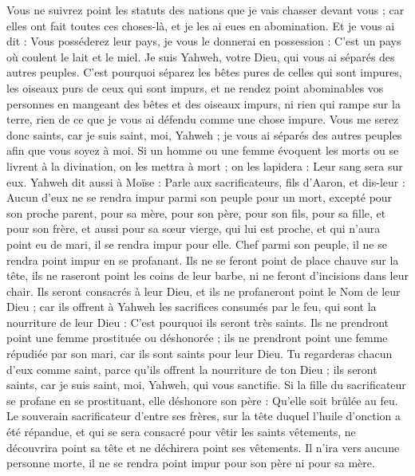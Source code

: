 \begin{multicols}{2}
Vous ne suivrez point les statuts des nations que je vais chasser devant vous ; car elles ont fait toutes ces choses-là, et je les ai eues en abomination.
Et je vous ai dit : Vous posséderez leur pays, je vous le donnerai en possession : C'est un pays où coulent le lait et le miel. Je suis Yahweh, votre Dieu, qui vous ai séparés des autres peuples.
C'est pourquoi séparez les bêtes pures de celles qui sont impures, les oiseaux purs de ceux qui sont impurs, et ne rendez point abominables vos personnes en mangeant des bêtes et des oiseaux impurs, ni rien qui rampe sur la terre, rien de ce que je vous ai défendu comme une chose impure.
Vous me serez donc saints, car je suis saint, moi, Yahweh ; je vous ai séparés des autres peuples afin que vous soyez à moi.
Si un homme ou une femme évoquent les morts ou se livrent à la divination, on les mettra à mort ; on les lapidera : Leur sang sera sur eux.
\VerseOne{}Yahweh dit aussi à Moïse : Parle aux sacrificateurs, fils d'Aaron, et dis-leur : Aucun d'eux ne se rendra impur parmi son peuple pour un mort,
excepté pour son proche parent, pour sa mère, pour son père, pour son fils, pour sa fille, et pour son frère,
et aussi pour sa sœur vierge, qui lui est proche, et qui n'aura point eu de mari, il se rendra impur pour elle.
Chef parmi son peuple, il ne se rendra point impur en se profanant.
Ils ne se feront point de place chauve sur la tête, ils ne raseront point les coins de leur barbe, ni ne feront d'incisions dans leur chair.
Ils seront consacrés à leur Dieu, et ils ne profaneront point le Nom de leur Dieu ; car ils offrent à Yahweh les sacrifices consumés par le feu, qui sont la nourriture de leur Dieu : C'est pourquoi ils seront très saints.
Ils ne prendront point une femme prostituée ou déshonorée ; ils ne prendront point une femme répudiée par son mari, car ils sont saints pour leur Dieu.
Tu regarderas chacun d'eux comme saint, parce qu'ils offrent la nourriture de ton Dieu ; ils seront saints, car je suis saint, moi, Yahweh, qui vous sanctifie.
Si la fille du sacrificateur se profane en se prostituant, elle déshonore son père : Qu'elle soit brûlée au feu.
Le souverain sacrificateur d'entre ses frères, sur la tête duquel l'huile d'onction a été répandue, et qui se sera consacré pour vêtir les saints vêtements, ne découvrira point sa tête et ne déchirera point ses vêtements.
Il n'ira vers aucune personne morte, il ne se rendra point impur pour son père ni pour sa mère.

\end{multicols}
